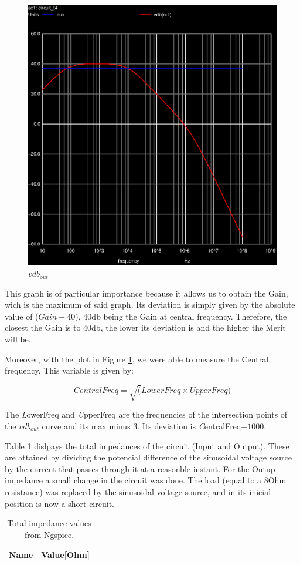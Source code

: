 \begin{figure}[ht]
	\centering
	\includegraphics[width=0.6\linewidth]{acvout.eps}
	\caption{$vdb_{out}$ }
\label{fig:Vout}
\end{figure}

This graph is of particular importance because it allows us to obtain the Gain, wich is the maximum of said graph. Its deviation is simply given by the absolute value of ($Gain - 40$), 40db being the Gain at central frequency. Therefore, the closest the Gain is to 40db, the lower its deviation is and the higher the Merit will be. 

Moreover, with the plot in Figure \ref{fig:Vout}, we were able to measure the Central frequency. This variable is given by: 

\[
CentralFreq = \sqrt(LowerFreq\times UpperFreq) 
\]

The {\emph LowerFreq} and {\emph UpperFreq} are the frequencies of the intersection points of the $vdb_{out}$ curve and its max minus $3$. Its deviation is {\emph CentralFreq}$-1000$.


Table \ref{tab:imp_sim} dislpays the total impedances of the circuit (Input and Output). These are attained by dividing the potencial difference of the sinusoidal voltage source by the current that passes through it at a reasonble instant. For the Outup impedance a small change in the circuit was done. The load (equal to a 8Ohm resistance) was replaced by the sinusoidal voltage source, and in its inicial position is now a short-circuit.

\begin{table}[ht]
	\centering
	\begin{tabular}{|l|r|}
		\hline    
		{\bf Name} & {\bf Value[Ohm]} \\ \hline
    		
    		
	\end{tabular}
	
	\caption{Total impedance values from Ngspice.}
    
\label{tab:imp_sim}
\end{table}

